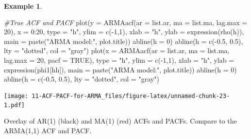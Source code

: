 \documentclass[
]{book}
\newenvironment{Shaded}{\begin{snugshade}}{\end{snugshade}}
\newcommand{\AttributeTok}[1]{\textcolor[rgb]{0.77,0.63,0.00}{#1}}
\newcommand{\CommentTok}[1]{\textcolor[rgb]{0.56,0.35,0.01}{\textit{#1}}}
\newcommand{\ConstantTok}[1]{\textcolor[rgb]{0.00,0.00,0.00}{#1}}
\newcommand{\DecValTok}[1]{\textcolor[rgb]{0.00,0.00,0.81}{#1}}
\newcommand{\FloatTok}[1]{\textcolor[rgb]{0.00,0.00,0.81}{#1}}
\newcommand{\FunctionTok}[1]{\textcolor[rgb]{0.00,0.00,0.00}{#1}}
\newcommand{\NormalTok}[1]{#1}
\newcommand{\SpecialCharTok}[1]{\textcolor[rgb]{0.00,0.00,0.00}{#1}}
\newcommand{\StringTok}[1]{\textcolor[rgb]{0.31,0.60,0.02}{#1}}
\theoremstyle{definition}
\theoremstyle{definition}
\newtheorem{example}{Example}[chapter]
\theoremstyle{definition}
\theoremstyle{definition}
\theoremstyle{remark}
\begin{document}
\begin{example}
\begin{Shaded}
\begin{Highlighting}[]
  
  \CommentTok{\#True ACF and PACF}
  \FunctionTok{plot}\NormalTok{(}\AttributeTok{y =} \FunctionTok{ARMAacf}\NormalTok{(}\AttributeTok{ar =}\NormalTok{ list.ar, }\AttributeTok{ma =}\NormalTok{ list.ma, }\AttributeTok{lag.max =} \DecValTok{20}\NormalTok{), }\AttributeTok{x =} \DecValTok{0}\SpecialCharTok{:}\DecValTok{20}\NormalTok{, }\AttributeTok{type =} \StringTok{"h"}\NormalTok{, }\AttributeTok{ylim =} \FunctionTok{c}\NormalTok{(}\SpecialCharTok{{-}}\DecValTok{1}\NormalTok{,}\DecValTok{1}\NormalTok{), }\AttributeTok{xlab =} \StringTok{"h"}\NormalTok{, }\AttributeTok{ylab =} \FunctionTok{expression}\NormalTok{(}\FunctionTok{rho}\NormalTok{(h)),}
    \AttributeTok{main =} \FunctionTok{paste}\NormalTok{(}\StringTok{"ARMA model:"}\NormalTok{, plot.title))}
  \FunctionTok{abline}\NormalTok{(}\AttributeTok{h =} \DecValTok{0}\NormalTok{)}
  \FunctionTok{abline}\NormalTok{(}\AttributeTok{h =} \FunctionTok{c}\NormalTok{(}\SpecialCharTok{{-}}\FloatTok{0.5}\NormalTok{, }\FloatTok{0.5}\NormalTok{), }\AttributeTok{lty =} \StringTok{"dotted"}\NormalTok{, }\AttributeTok{col =} \StringTok{"gray"}\NormalTok{)}
  \FunctionTok{plot}\NormalTok{(}\AttributeTok{x =} \FunctionTok{ARMAacf}\NormalTok{(}\AttributeTok{ar =}\NormalTok{ list.ar, }\AttributeTok{ma =}\NormalTok{ list.ma, }\AttributeTok{lag.max =} \DecValTok{20}\NormalTok{, }\AttributeTok{pacf =} \ConstantTok{TRUE}\NormalTok{), }\AttributeTok{type =} \StringTok{"h"}\NormalTok{, }\AttributeTok{ylim =} \FunctionTok{c}\NormalTok{(}\SpecialCharTok{{-}}\DecValTok{1}\NormalTok{,}\DecValTok{1}\NormalTok{), }\AttributeTok{xlab =} \StringTok{"h"}\NormalTok{, }\AttributeTok{ylab =} \FunctionTok{expression}\NormalTok{(phi1[hh]),}
    \AttributeTok{main =} \FunctionTok{paste}\NormalTok{(}\StringTok{"ARMA model:"}\NormalTok{, plot.title))}
  \FunctionTok{abline}\NormalTok{(}\AttributeTok{h =} \DecValTok{0}\NormalTok{)}
  \FunctionTok{abline}\NormalTok{(}\AttributeTok{h =} \FunctionTok{c}\NormalTok{(}\SpecialCharTok{{-}}\FloatTok{0.5}\NormalTok{, }\FloatTok{0.5}\NormalTok{), }\AttributeTok{lty =} \StringTok{"dotted"}\NormalTok{, }\AttributeTok{col =} \StringTok{"gray"}\NormalTok{)}
\end{Highlighting}
\end{Shaded}

\texttt{[image: 11-ACF-PACF-for-ARMA\_files/figure-latex/unnamed-chunk-23-1.pdf]}

Overlay of AR(1) (black) and MA(1) (red) ACFs and PACFs. Compare to the ARMA(1,1) ACF and PACF.


\end{example}
\end{document}
